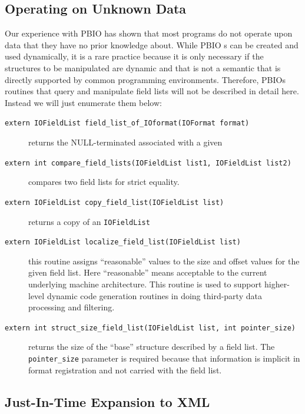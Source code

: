 \subsection{Operating on Unknown Data}
Our experience with PBIO has shown that most programs do not operate upon
data that they have no prior knowledge about.  While PBIO
s can be created and used dynamically, it is a rare
practice because it is only necessary if the structures to be manipulated
are dynamic and that is not a semantic that is directly supported by common
programming environments.  Therefore, PBIOs routines that query and
manipulate field lists will not be described in detail here.  Instead we
will just enumerate them below:
\begin{description}
\item[{\tt extern IOFieldList field\_list\_of\_IOformat(IOFormat format)}]
returns the NULL-terminated  associated with a given
\item[{\tt extern int compare\_field\_lists(IOFieldList list1, IOFieldList
list2)}]
compares two field lists for strict equality.
\item[{\tt extern IOFieldList copy\_field\_list(IOFieldList list)}]
returns a copy of an {\tt IOFieldList}
\item[{\tt extern IOFieldList localize\_field\_list(IOFieldList list)}]
this routine assigns ``reasonable'' values to the size and offset values
for the given field list.  Here ``reasonable'' means acceptable to the
current underlying machine architecture.  This routine is used to support
higher-level dynamic code generation routines in doing third-party data
processing and filtering.
\item[{\tt extern int struct\_size\_field\_list(IOFieldList list, int pointer\_size)}]
returns the size of the ``base'' structure described by a field list.  The
{\tt pointer\_size} parameter is required because that information is
implicit in format registration and not carried with the field list.
\end{description}

\subsection{Just-In-Time Expansion to XML}

